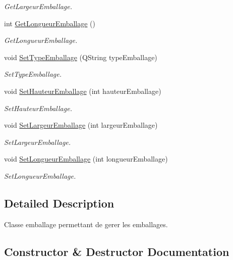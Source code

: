 \begin{DoxyCompactItemize}
\begin{DoxyCompactList}\small\item\em Get\+Largeur\+Emballage. \end{DoxyCompactList}\item 
int \mbox{\hyperlink{class_emballage_ab38aa0657c07c5ba3532be21334ab2f7}{Get\+Longueur\+Emballage}} ()
\begin{DoxyCompactList}\small\item\em Get\+Longueur\+Emballage. \end{DoxyCompactList}\item 
void \mbox{\hyperlink{class_emballage_af26f49fa86f70ec4bbb5eaca71865570}{Set\+Type\+Emballage}} (Q\+String type\+Emballage)
\begin{DoxyCompactList}\small\item\em Set\+Type\+Emballage. \end{DoxyCompactList}\item 
void \mbox{\hyperlink{class_emballage_a8a91d921f0cb30c14bbbec3858b2dfce}{Set\+Hauteur\+Emballage}} (int hauteur\+Emballage)
\begin{DoxyCompactList}\small\item\em Set\+Hauteur\+Emballage. \end{DoxyCompactList}\item 
void \mbox{\hyperlink{class_emballage_ac6733f3663c253d4cbfbeb467a35dfc1}{Set\+Largeur\+Emballage}} (int largeur\+Emballage)
\begin{DoxyCompactList}\small\item\em Set\+Largeur\+Emballage. \end{DoxyCompactList}\item 
void \mbox{\hyperlink{class_emballage_ad6d542ac95bc816d87816e9b5eb5ce0b}{Set\+Longueur\+Emballage}} (int longueur\+Emballage)
\begin{DoxyCompactList}\small\item\em Set\+Longueur\+Emballage. \end{DoxyCompactList}\end{DoxyCompactItemize}


\subsection{Detailed Description}
Classe emballage permettant de gerer les emballages. 

\subsection{Constructor \& Destructor Documentation}
\mbox{\label{class_emballage_ae74a1117a30e239442418bb49a69db47}} 
